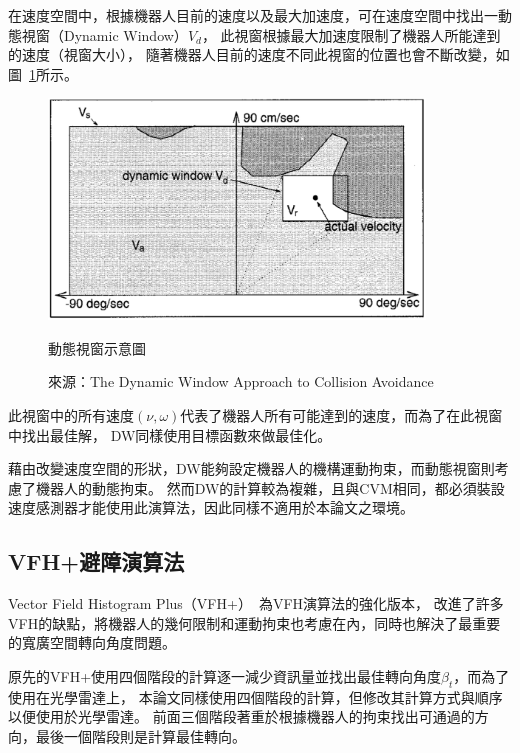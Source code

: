 在速度空間中，根據機器人目前的速度以及最大加速度，可在速度空間中找出一動態視窗（Dynamic Window）$V_d$，
此視窗根據最大加速度限制了機器人所能達到的速度（視窗大小），
隨著機器人目前的速度不同此視窗的位置也會不斷改變，如圖~\ref{f:dynamic_window}所示。
\begin{figure}[h!]
	\centering
	\includegraphics[width=10cm]{figures/algorithm/dynamic_window}
	\caption{動態視窗示意圖}
	\caption*{來源：The Dynamic Window Approach to Collision Avoidance}
	\label{f:dynamic_window}
\end{figure}
此視窗中的所有速度$(\nu,\omega)$代表了機器人所有可能達到的速度，而為了在此視窗中找出最佳解，
DW同樣使用目標函數來做最佳化。

藉由改變速度空間的形狀，DW能夠設定機器人的機構運動拘束，而動態視窗則考慮了機器人的動態拘束。
然而DW的計算較為複雜，且與CVM相同，都必須裝設速度感測器才能使用此演算法，因此同樣不適用於本論文之環境。

\subsection{VFH+避障演算法}
Vector Field Histogram Plus（VFH+）~\cite{Ulrich:1998:VFHPlus}為VFH演算法的強化版本，
改進了許多VFH的缺點，將機器人的幾何限制和運動拘束也考慮在內，同時也解決了最重要的寬廣空間轉向角度問題。

原先的VFH+使用四個階段的計算逐一減少資訊量並找出最佳轉向角度$\beta_t$，而為了使用在光學雷達上，
本論文同樣使用四個階段的計算，但修改其計算方式與順序以便使用於光學雷達。
前面三個階段著重於根據機器人的拘束找出可通過的方向，最後一個階段則是計算最佳轉向。

